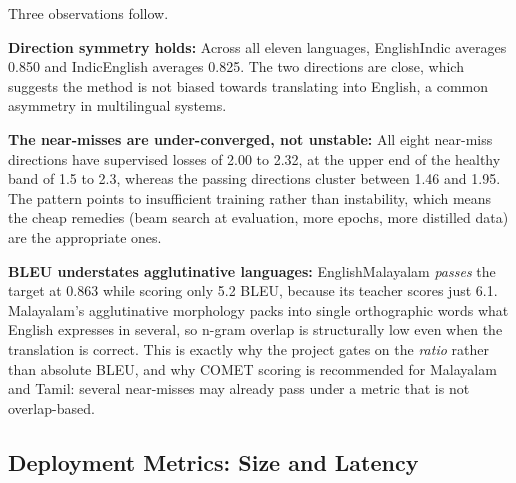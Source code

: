 Three observations follow.

\textbf{Direction symmetry holds:} Across all eleven languages,
English\arrowto{}Indic averages 0.850 and Indic\arrowto{}English averages 0.825.
The two directions are close, which suggests the method is not biased towards
translating into English, a common asymmetry in multilingual systems.

\textbf{The near-misses are under-converged, not unstable:} All eight near-miss
directions have supervised losses of 2.00 to 2.32, at the upper end of the
healthy band of 1.5 to 2.3, whereas the passing directions cluster between 1.46
and 1.95. The pattern points to insufficient training rather than instability,
which means the cheap remedies (beam search at evaluation, more epochs, more
distilled data) are the appropriate ones.

\textbf{BLEU understates agglutinative languages:} English\arrowto{}Malayalam
\emph{passes} the target at 0.863 while scoring only 5.2 BLEU, because its
teacher scores just 6.1. Malayalam's agglutinative morphology packs into single
orthographic words what English expresses in several, so n-gram overlap is
structurally low even when the translation is correct. This is exactly why the
project gates on the \emph{ratio} rather than absolute BLEU, and why COMET
scoring is recommended for Malayalam and Tamil: several near-misses may already
pass under a metric that is not overlap-based.

\subsection{Deployment Metrics: Size and Latency}
\label{subsec:deploymetrics}

